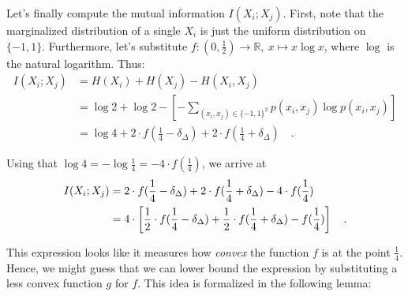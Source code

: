 \documentclass[../../main.tex]{subfiles}
\begin{document}
Let's finally compute the mutual information $I(X_i; X_j)$. First, note that the marginalized distribution of a single $X_i$ is just the uniform distribution on $\{-1, 1\}$. Furthermore, let's substitute $f: (0, \frac{1}{2}) \to \mathbb{R}, \ x \mapsto x \log x$, where $\log$ is the natural logarithm. Thus:
\begin{align*}
    I(X_i; X_j) &= H(X_i) + H(X_j) - H(X_i, X_j) \\
    &= \log 2 + \log 2 - \left[ - \sum_{(x_i, x_j) \in \{-1, 1\}^2} p(x_i, x_j) \log p(x_i, x_j) \right] \\
    &= \log 4 + 2 \cdot f(\frac{1}{4} - \delta_\Delta) + 2 \cdot f(\frac{1}{4} + \delta_\Delta) \quad .
\end{align*}

Using that $\log 4 = - \log \frac{1}{4} = -4 \cdot f(\frac{1}{4})$, we arrive at
\begin{align}
    I(X_i; X_j) &= 2 \cdot f(\frac{1}{4} - \delta_\Delta) + 2 \cdot f(\frac{1}{4} + \delta_\Delta) -4 \cdot f(\frac{1}{4}) \notag \\
    &= 4 \cdot \left[ \frac{1}{2} \cdot f(\frac{1}{4} - \delta_\Delta) + \frac{1}{2} \cdot f(\frac{1}{4} + \delta_\Delta) - f(\frac{1}{4}) \right] \quad . \label{eq:mutual_information_in_terms_of_f}
\end{align}

This expression looks like it measures how \emph{convex} the function $f$ is at the point $\frac{1}{4}$. Hence, we might guess that we can lower bound the expression by substituting a less convex function $g$ for $f$. This idea is formalized in the following lemma:
\end{document}

